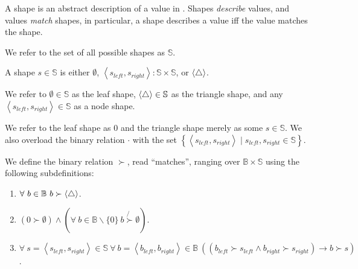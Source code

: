 A shape is an abstract description of a value in \D{}. Shapes \emph{describe}
values, and values \emph{match} shapes, in particular, a shape describes a
value iff the value matches the shape.

\begin{definition} We refer to the set of all possible shapes as
$\mathbb{S}$.\end{definition}

\begin{definition} A shape $s\in\mathbb{S}$ is either $\emptyset$,
$\left\langle s_{left},s_{right} \right\rangle : \mathbb{S} \times
\mathbb{S}$, or $\left\langle\bigtriangleup\right\rangle$.\end{definition}

We refer to $\emptyset\in\mathbb{S}$ as the leaf shape, $\left\langle\bigtriangleup\right\rangle\in\mathbb{S}$ as
the triangle shape, and any $\left\langle s_{left},s_{right} \right\rangle
\in\mathbb{S}$ as a node shape.

\begin{definition} We refer to the leaf shape as $0$ and the triangle shape
merely as some $s\in\mathbb{S}$. We also overload the binary relation $\cdot$
with the set $\left\{ \left\langle s_{left}, s_{right} \right\rangle \mid
s_{left}, s_{right} \in\mathbb{S} \right\}$.\end{definition}

\begin{definition}\label{definition:succ} We define the binary relation
$\succ$, read ``matches'', ranging over $\mathbb{B}\times\mathbb{S}$ using the
following subdefinitions:

\begin{enumerate}

\item \label{definition:any-shape} $\forall\ b\in\mathbb{B}\ b\succ\any$.

\item \label{definition:leaf-shape} $ \left( 0\succ \emptyset \right) \wedge
\left( \forall\ b\in\mathbb{B}\backslash\{0\}\ b\not{\succ} \emptyset \right)$.

\item \label{definition:node-shape} $\forall\ s=\left\langle s_{left},s_{right}
\right\rangle \in\mathbb{S}\ \forall\ b= \left\langle b_{left},b_{right}
\right\rangle \in\mathbb{B}\ \left( \left( b_{left} \succ s_{left} \wedge
b_{right} \succ s_{right} \right) \rightarrow b \succ s \right)$.

\end{enumerate}

\end{definition}

